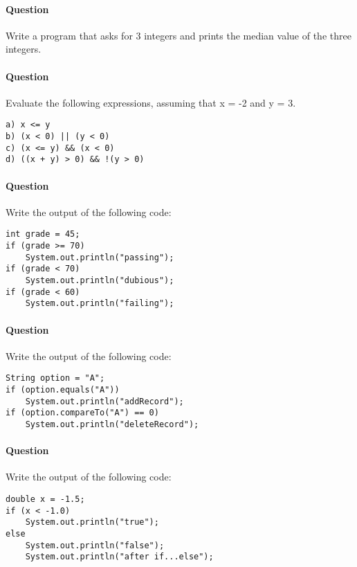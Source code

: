 \documentclass{article}
\begin{document}
\addtocounter{question_num}{1}
\paragraph{Question }
Write a program that asks for 3 integers and prints the median value of the three integers.

\addtocounter{question_num}{1}
\paragraph{Question }
Evaluate the following expressions, assuming that x = -2 and y = 3.
\begin{lstlisting} 
a) x <= y 
b) (x < 0) || (y < 0)
c) (x <= y) && (x < 0)
d) ((x + y) > 0) && !(y > 0)
\end{lstlisting}

\addtocounter{question_num}{1}
\paragraph{Question }
Write the output of the following code:
\begin{lstlisting}
int grade = 45;
if (grade >= 70)
	System.out.println("passing");
if (grade < 70)
	System.out.println("dubious");
if (grade < 60)
	System.out.println("failing");
\end{lstlisting}

\addtocounter{question_num}{1}
\paragraph{Question }
Write the output of the following code:
\begin{lstlisting}
String option = "A";
if (option.equals("A"))
	System.out.println("addRecord");
if (option.compareTo("A") == 0)
	System.out.println("deleteRecord");
\end{lstlisting}

\addtocounter{question_num}{1}
\paragraph{Question }
Write the output of the following code:
\begin{lstlisting}
double x = -1.5;
if (x < -1.0)
	System.out.println("true");
else
	System.out.println("false");
	System.out.println("after if...else");
\end{lstlisting}
\end{document}
